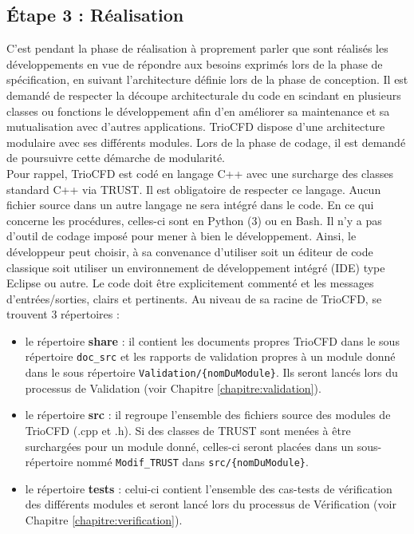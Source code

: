 \subsection{Étape 3 : R\'ealisation}
C'est pendant la phase de réalisation à proprement parler que sont réalisés
les développements en vue de répondre aux besoins exprimés lors de la phase de spécification,
en suivant l'architecture définie lors de la phase de conception.
Il est demandé de respecter la découpe architecturale du code
en scindant en plusieurs classes ou fonctions le développement afin d'en améliorer sa maintenance
et sa mutualisation avec d'autres applications.
TrioCFD dispose d'une architecture modulaire avec ses différents modules.
Lors de la phase de codage, il est demandé de poursuivre cette démarche de modularité.\\

Pour rappel, TrioCFD est codé en langage C++ avec une surcharge des classes standard C++ via TRUST.
Il est obligatoire de respecter ce langage.
Aucun fichier source dans un autre langage ne sera intégré dans le code.
En ce qui concerne les procédures, celles-ci sont en Python (3) ou en Bash.
Il n'y a pas d'outil de codage imposé pour mener à bien le développement.
Ainsi, le développeur peut choisir, à sa convenance d'utiliser
soit un éditeur de code classique
soit utiliser un environnement de développement intégré (IDE) type Eclipse ou autre.
Le code doit être explicitement commenté et les messages d'entrées/sorties, clairs et pertinents.
Au niveau de sa racine de TrioCFD, se trouvent 3 répertoires :
\begin{itemize}
   \item le répertoire \textbf{share} : il contient les documents propres TrioCFD dans le sous répertoire \texttt{doc\_src}
         et les rapports de validation propres \`a un module donn\'e dans le sous répertoire \texttt{Validation/\{nomDuModule\}}.
         Ils seront lanc\'es lors du processus de Validation (voir Chapitre \ref{chapitre:validation}).
   \item le répertoire \textbf{src} : il regroupe l'ensemble des fichiers source des modules de TrioCFD (.cpp et .h).
         Si des classes de TRUST sont menées à être surchargées pour un module donn\'e,
         celles-ci seront placées dans un sous-répertoire nommé \texttt{Modif\_TRUST} dans \texttt{src/\{nomDuModule\}}.
   \item le répertoire \textbf{tests} : celui-ci contient l'ensemble des cas-tests de vérification des diff\'erents modules
         et seront lancé lors du processus de Vérification (voir Chapitre \ref{chapitre:verification}).
\end{itemize}

